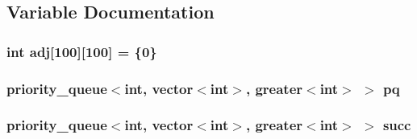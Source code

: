 \subsection{\-Variable \-Documentation}
\hypertarget{SpherePFD_8c_09_09_a5cc29cbda633cf803a14bc73ed26a902}{
\subsubsection[{adj}]{\setlength{\rightskip}{0pt plus 5cm}int {\bf adj}\mbox{[}100\mbox{]}\mbox{[}100\mbox{]} = \{0\}}}\label{SpherePFD_8c_09_09_a5cc29cbda633cf803a14bc73ed26a902}
\hypertarget{SpherePFD_8c_09_09_ab6bdd514724b32f635e208c56bdafe8d}{
\subsubsection[{pq}]{\setlength{\rightskip}{0pt plus 5cm}priority\-\_\-queue$<$int, vector$<$int$>$, greater$<$int$>$ $>$ {\bf pq}}}\label{SpherePFD_8c_09_09_ab6bdd514724b32f635e208c56bdafe8d}
\hypertarget{SpherePFD_8c_09_09_a528bc05abddf40ec8ae9b5c245e7282a}{
\subsubsection[{succ}]{\setlength{\rightskip}{0pt plus 5cm}priority\-\_\-queue$<$int, vector$<$int$>$, greater$<$int$>$ $>$ {\bf succ}}}\label{SpherePFD_8c_09_09_a528bc05abddf40ec8ae9b5c245e7282a}
